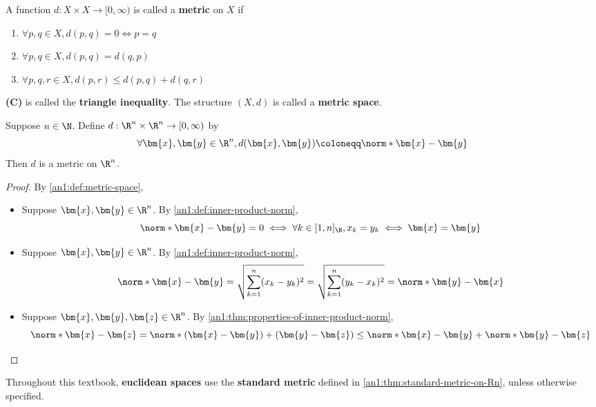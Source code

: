 \begin{definition} \label{an1:def:metric-space}
  A function $d: X \times X \to [0, \infty)$ is called a \textbf{metric} on $X$ if
  \begin{enumerate}[label=\textbf{(\Alph*)}]
    \item $\forall p, q \in X, d(p, q) = 0 \iff p = q$
    \item $\forall p, q \in X, d(p, q) = d(q, p)$
    \item $\forall p, q, r \in X, d(p, r) \leq d(p, q) + d(q, r)$
  \end{enumerate}
  \textbf{(C)} is called the \textbf{triangle inequality}. The structure $(X, d)$ is called a \textbf{metric space}.

\end{definition}

\begin{theorem} \label{an1:thm:standard-metric-on-Rn}
  Suppose $n \in \N$. Define $d: \R^{n} \times \R^{n} \to [0, \infty)$ by
  \[
    \forall \bm{x}, \bm{y} \in \R^{n}, d(\bm{x}, \bm{y}) \coloneqq \norm*{\bm{x} - \bm{y}}
  \]
  Then $d$ is a metric on $\R^{n}$.
\end{theorem}

\begin{proof}
  By \cref{an1:def:metric-space},
  \begin{itemize}
    \item Suppose $\bm{x}, \bm{y} \in \R^{n}$. By \cref{an1:def:inner-product-norm},
          \[
            \norm*{\bm{x} - \bm{y}} = 0 \iff \forall k \in [1, n]_{\N}, x_{k} = y_{k} \iff \bm{x} = \bm{y}
          \]
    \item Suppose $\bm{x}, \bm{y} \in \R^{n}$. By \cref{an1:def:inner-product-norm},
          \[
            \norm*{\bm{x} - \bm{y}} = \sqrt{\sum_{k = 1}^{n} (x_{k} - y_{k})^{2}}
            = \sqrt{\sum_{k = 1}^{n} (y_{k} - x_{k})^{2}} = \norm*{\bm{y} - \bm{x}}
          \]
    \item Suppose $\bm{x}, \bm{y}, \bm{z} \in \R^{n}$. By \cref{an1:thm:properties-of-inner-product-norm},
          \[
            \norm*{\bm{x} - \bm{z}} = \norm*{(\bm{x} - \bm{y}) + (\bm{y} - \bm{z})}
            \leq \norm*{\bm{x} - \bm{y}} + \norm*{\bm{y} - \bm{z}}
          \]
  \end{itemize}
\end{proof}

\begin{remark}
  Throughout this textbook, \textbf{euclidean spaces} use the \textbf{standard metric}
  defined in \cref{an1:thm:standard-metric-on-Rn}, unless otherwise specified.
\end{remark}

